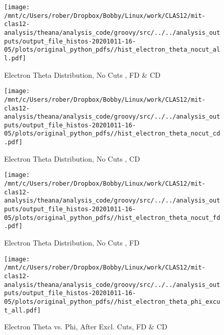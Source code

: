 \documentclass{article}
\begin{document}
\begin{landscape}
    \begin{figure}[h]
        \centering

        \texttt{[image: /mnt/c/Users/rober/Dropbox/Bobby/Linux/work/CLAS12/mit-clas12-analysis/theana/analysis\_code/groovy/src/../../analysis\_outputs/output\_file\_histos-20201011-16-05/plots/original\_python\_pdfs//hist\_electron\_theta\_nocut\_all.pdf]}
        \captionsetup{textformat=empty,labelformat=blank}
        \caption{Electron Theta Distribution, No Cuts , FD \& CD}
    \end{figure}
    \clearpage
    
    \begin{figure}[h]
        \centering

        \texttt{[image: /mnt/c/Users/rober/Dropbox/Bobby/Linux/work/CLAS12/mit-clas12-analysis/theana/analysis\_code/groovy/src/../../analysis\_outputs/output\_file\_histos-20201011-16-05/plots/original\_python\_pdfs//hist\_electron\_theta\_nocut\_cd.pdf]}
        \captionsetup{textformat=empty,labelformat=blank}
        \caption{Electron Theta Distribution, No Cuts , CD}
    \end{figure}
    \clearpage
    
    \begin{figure}[h]
        \centering

        \texttt{[image: /mnt/c/Users/rober/Dropbox/Bobby/Linux/work/CLAS12/mit-clas12-analysis/theana/analysis\_code/groovy/src/../../analysis\_outputs/output\_file\_histos-20201011-16-05/plots/original\_python\_pdfs//hist\_electron\_theta\_nocut\_fd.pdf]}
        \captionsetup{textformat=empty,labelformat=blank}
        \caption{Electron Theta Distribution, No Cuts , FD}
    \end{figure}
    \clearpage
    
    \begin{figure}[h]
        \centering

        \texttt{[image: /mnt/c/Users/rober/Dropbox/Bobby/Linux/work/CLAS12/mit-clas12-analysis/theana/analysis\_code/groovy/src/../../analysis\_outputs/output\_file\_histos-20201011-16-05/plots/original\_python\_pdfs//hist\_electron\_theta\_phi\_excut\_all.pdf]}
        \captionsetup{textformat=empty,labelformat=blank}
        \caption{Electron Theta vs. Phi, After Excl. Cuts, FD \& CD}
    \end{figure}
    \clearpage
    
    \begin{figure}[h]
        \centering


\end{figure}
\end{landscape}
\end{document}
